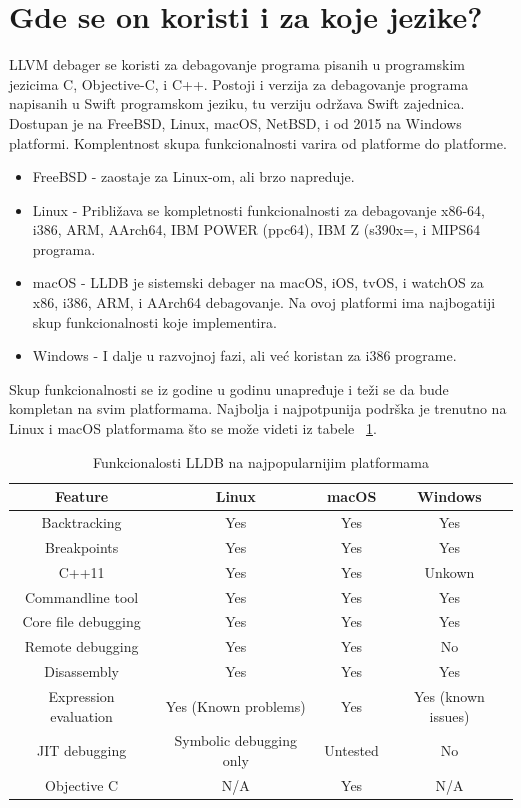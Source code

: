 \documentclass[a4paper]{article}
\begin{document}
\section{Gde se on koristi i za koje jezike? }
\label{sec: Gde se on koristi i za koje jezike?}
LLVM debager se koristi za debagovanje programa pisanih u programskim jezicima C, Objective-C, i C++. Postoji i verzija za debagovanje programa napisanih u Swift programskom jeziku, tu verziju održava Swift zajednica. 
Dostupan je na FreeBSD, Linux, macOS, NetBSD, i od 2015 na Windows platformi. Komplentnost skupa funkcionalnosti varira od platforme do platforme.
\begin{itemize}
\item FreeBSD - zaostaje za Linux-om, ali brzo napreduje.
\item Linux - Približava se kompletnosti funkcionalnosti za debagovanje x86-64, i386, ARM, AArch64, IBM POWER (ppc64), IBM Z (s390x=, i MIPS64 programa.
\item macOS - LLDB je sistemski debager na macOS, iOS, tvOS, i watchOS za x86, i386, ARM, i AArch64 debagovanje. Na ovoj platformi ima najbogatiji skup funkcionalnosti koje implementira.
\item Windows - I dalje u razvojnoj fazi, ali već koristan za i386 programe.
\end{itemize}
Skup funkcionalnosti se iz godine u godinu unapređuje i teži se da bude kompletan na svim platformama. Najbolja i najpotpunija podrška je trenutno na Linux i macOS platformama što se može videti iz tabele ~\ref{table:1}.

\begin{table}[h!]
\center
\caption{Funkcionalosti LLDB na najpopularnijim platformama}
\label{table:1}
\begin{tabular}{|c|c c c|} 
 \hline
 Feature & Linux & macOS & Windows \\ [0.5ex] 
 \hline
 Backtracking & Yes & Yes & Yes \\ 
 Breakpoints & Yes & Yes & Yes \\
 C++11 & Yes & Yes & Unkown \\
 Commandline tool & Yes & Yes & Yes \\
 Core file debugging  & Yes & Yes & Yes \\
  Remote debugging & Yes & Yes & No\\ [1ex] 
 Disassembly & Yes & Yes & Yes  \\
 Expression evaluation & Yes (Known problems)& Yes & Yes (known issues) \\
 JIT debugging & Symbolic debugging only & Untested & No \\
 Objective C & N/A & Yes & N/A \\
 \hline
\end{tabular}
\end{table}
\end{document}
